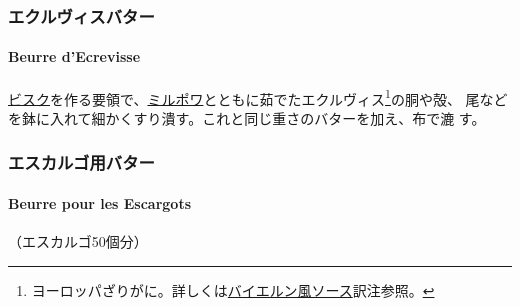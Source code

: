 \begin{recette}
\maeaki

\hypertarget{ux30a8ux30afux30ebux30f4ux30a3ux30b9ux30d0ux30bfux30fc}{%
\subsubsection{エクルヴィスバター}\label{ux30a8ux30afux30ebux30f4ux30a3ux30b9ux30d0ux30bfux30fc}}

\hypertarget{beurre-d-ecrevisse}{%
\paragraph{Beurre d'Ecrevisse}\label{beurre-d-ecrevisse}}


\protect\hyperlink{}{ビスク}を作る要領で、\protect\hyperlink{mirepoix}{ミルポワ}とともに茹でたエクルヴィス\footnote{ヨーロッパざりがに。詳しくは\protect\hyperlink{sauce-bavaroise}{バイエルン風ソース}訳注参照。}の胴や殻、
尾などを鉢に入れて細かくすり潰す。これと同じ重さのバターを加え、布で漉
す。

\maeaki

\hypertarget{ux30a8ux30b9ux30abux30ebux30b4ux7528ux30d0ux30bfux30fc}{%
\subsubsection{エスカルゴ用バター}\label{ux30a8ux30b9ux30abux30ebux30b4ux7528ux30d0ux30bfux30fc}}

\hypertarget{beurre-pour-les-escargots}{%
\paragraph{Beurre pour les Escargots}\label{beurre-pour-les-escargots}}


（エスカルゴ50個分）


\end{recette}
